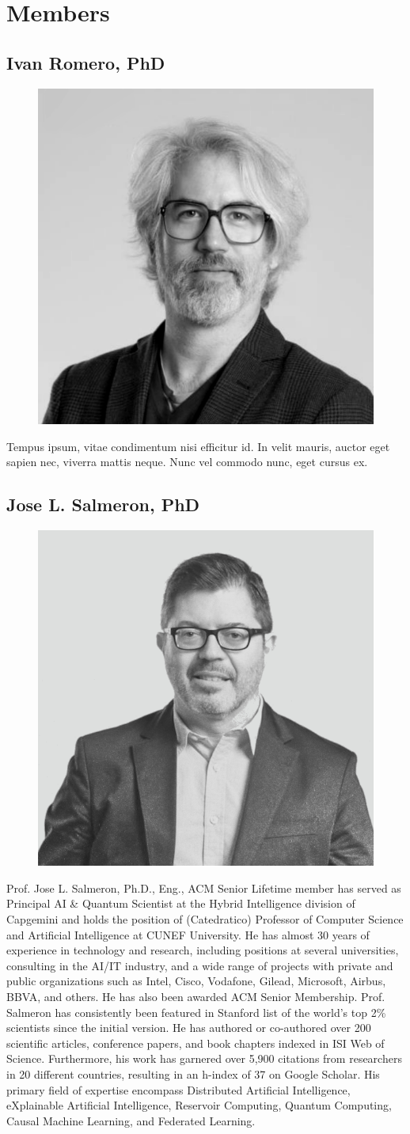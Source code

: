 \section{Members} \label{sec:team}

\subsection{Ivan Romero, PhD}

\begin{figure}[!ht]
  \centering
  \includegraphics[width=.25\textwidth]{../../img/team/romero.png}
  \caption{}
\end{figure}


Tempus ipsum, vitae condimentum nisi efficitur id. In velit mauris, auctor eget
sapien nec, viverra mattis neque. Nunc vel commodo nunc, eget cursus ex.


\subsection{Jose L. Salmeron, PhD}

\begin{figure}[!ht]
  \centering
  \includegraphics[width=.25\textwidth]{../../img/team/salmeron.png}
  \caption{}
\end{figure}

Prof. Jose L. Salmeron, Ph.D., Eng., ACM Senior Lifetime member has served as Principal AI \& Quantum Scientist at the Hybrid Intelligence division of Capgemini and holds the position of (Catedratico) Professor of Computer Science and Artificial Intelligence at CUNEF University. He has almost 30 years of experience in technology and research, including positions at several universities, consulting in the AI/IT industry, and a wide range of projects with private and public organizations such as Intel, Cisco, Vodafone, Gilead, Microsoft, Airbus, BBVA, and others. He has also been awarded ACM Senior Membership. Prof. Salmeron has consistently been featured in Stanford list of the world’s top 2\% scientists since the initial version. He has authored or co-authored over 200 scientific articles, conference papers, and book chapters indexed in ISI Web of Science. Furthermore, his work has garnered over 5,900 citations from researchers in 20 different countries, resulting in an h-index of 37 on Google Scholar. His primary field of expertise encompass Distributed Artificial Intelligence, eXplainable Artificial Intelligence, Reservoir Computing, Quantum Computing, Causal Machine Learning, and Federated Learning.